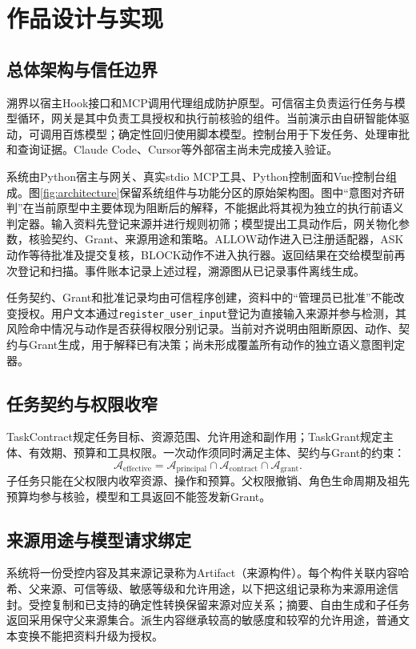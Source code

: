 \chapter{作品设计与实现}
\section{总体架构与信任边界}
溯界以宿主Hook接口和MCP调用代理组成防护原型。可信宿主负责运行任务与模型循环，网关是其中负责工具授权和执行前核验的组件。当前演示由自研智能体驱动，可调用百炼模型；确定性回归使用脚本模型。控制台用于下发任务、处理审批和查询证据。Claude Code、Cursor等外部宿主尚未完成接入验证。

系统由Python宿主与网关、真实stdio MCP工具、Python控制面和Vue控制台组成。图\ref{fig:architecture}保留系统组件与功能分区的原始架构图。图中“意图对齐研判”在当前原型中主要体现为阻断后的解释，不能据此将其视为独立的执行前语义判定器。输入资料先登记来源并进行规则初筛；模型提出工具动作后，网关物化参数，核验契约、Grant、来源用途和策略。ALLOW动作进入已注册适配器，ASK动作等待批准及提交复核，BLOCK动作不进入执行器。返回结果在交给模型前再次登记和扫描。事件账本记录上述过程，溯源图从已记录事件离线生成。



任务契约、Grant和批准记录均由可信程序创建，资料中的“管理员已批准”不能改变授权。用户文本通过\texttt{register\_user\_input}登记为直接输入来源并参与检测，其风险命中情况与动作是否获得权限分别记录。当前对齐说明由阻断原因、动作、契约与Grant生成，用于解释已有决策；尚未形成覆盖所有动作的独立语义意图判定器。

\section{任务契约与权限收窄}
TaskContract规定任务目标、资源范围、允许用途和副作用；TaskGrant规定主体、有效期、预算和工具权限。一次动作须同时满足主体、契约与Grant的约束：
\begin{equation}
\mathcal A_{\mathrm{effective}}=\mathcal A_{\mathrm{principal}}\cap\mathcal A_{\mathrm{contract}}\cap\mathcal A_{\mathrm{grant}}.
\end{equation}
子任务只能在父权限内收窄资源、操作和预算。父权限撤销、角色生命周期及祖先预算均参与核验，模型和工具返回不能签发新Grant。

\section{来源用途与模型请求绑定}
系统将一份受控内容及其来源记录称为Artifact（来源构件）。每个构件关联内容哈希、父来源、可信等级、敏感等级和允许用途，以下把这组记录称为来源用途信封。受控复制和已支持的确定性转换保留来源对应关系；摘要、自由生成和子任务返回采用保守父来源集合。派生内容继承较高的敏感度和较窄的允许用途，普通文本变换不能把资料升级为授权。

